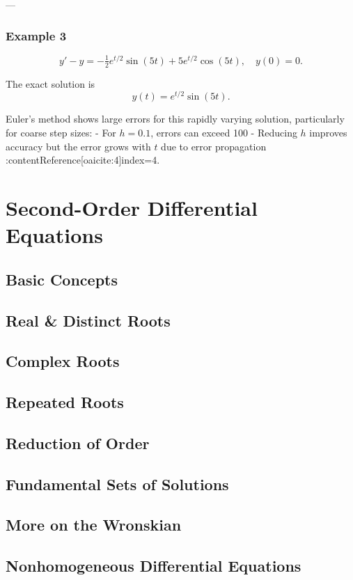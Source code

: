 \documentclass[12pt]{book}
\begin{document}
---

\subsection*{Example 3}

\[
y' - y = -\tfrac12 e^{t/2} \sin(5t) + 5 e^{t/2} \cos(5t), \quad y(0) = 0.
\]

The exact solution is
\[
y(t) = e^{t/2} \sin(5t).
\]

Euler’s method shows large errors for this rapidly varying solution, particularly for coarse step sizes:
- For \(h=0.1\), errors can exceed 100%
- Reducing \(h\) improves accuracy but the error grows with \(t\) due to error propagation :contentReference[oaicite:4]{index=4}.


\chapter{Second-Order Differential Equations}
\section{Basic Concepts}
\section{Real \& Distinct Roots}
\section{Complex Roots}
\section{Repeated Roots}
\section{Reduction of Order}
\section{Fundamental Sets of Solutions}
\section{More on the Wronskian}
\section{Nonhomogeneous Differential Equations}
\end{document}
